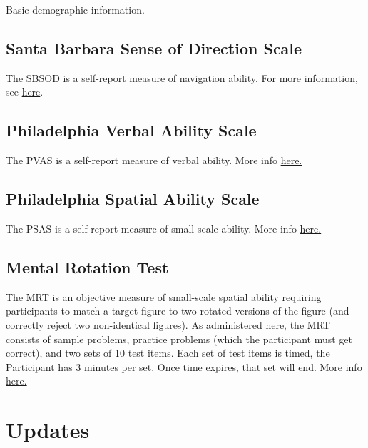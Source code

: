 \documentclass[
  12pt,
]{book}
\begin{document}
Basic demographic information.

\hypertarget{santa-barbara-sense-of-direction-scale}{%
\section{Santa Barbara Sense of Direction Scale}\label{santa-barbara-sense-of-direction-scale}}

The SBSOD is a self-report measure of navigation ability. For more information, see \href{https://www.silc.northwestern.edu/santa-barbara-sense-of-direction-sbsod/}{here}.

\hypertarget{philadelphia-verbal-ability-scale}{%
\section{Philadelphia Verbal Ability Scale}\label{philadelphia-verbal-ability-scale}}

The PVAS is a self-report measure of verbal ability. More info \href{https://link.springer.com/chapter/10.1007/978-3-642-14749-4_10}{here.}

\hypertarget{philadelphia-spatial-ability-scale}{%
\section{Philadelphia Spatial Ability Scale}\label{philadelphia-spatial-ability-scale}}

The PSAS is a self-report measure of small-scale ability. More info \href{https://link.springer.com/chapter/10.1007/978-3-642-14749-4_10}{here.}

\hypertarget{mental-rotation-test}{%
\section{Mental Rotation Test}\label{mental-rotation-test}}

The MRT is an objective measure of small-scale spatial ability requiring participants to match a target figure to two rotated versions of the figure (and correctly reject two non-identical figures). As administered here, the MRT consists of sample problems, practice problems (which the participant must get correct), and two sets of 10 test items. Each set of test items is timed, the Participant has 3 minutes per set. Once time expires, that set will end. More info \href{https://www.silc.northwestern.edu/library-of-shepard-and-metzler-type-mental-rotation-stimuli/}{here.}

\hypertarget{updates}{%
\chapter{Updates}\label{updates}}
\end{document}
